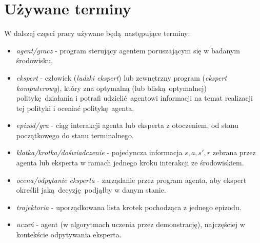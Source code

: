 \section{Używane terminy}

W dalszej częsci pracy używane będą następujące terminy:

\begin{itemize}
\item \textit{agent/gracz} - program sterujący agentem poruszającym się w badanym środowisku,
\item \textit{ekspert} - człowiek (\textit{ludzki ekspert}) lub zewnętrzny program (\textit{ekspert komputerowy}), który zna optymalną (lub bliską optymalnej) politykę działania i potrafi udzielić agentowi informacji na temat realizacji tej polityki i oceniać politykę agenta,
\item \textit{epizod/gra} - ciąg interakcji agenta lub eksperta z otoczeniem, od stanu początkowego do stanu terminalnego.
\item \textit{klatka/krotka/doświadczenie} - pojedyncza informacja $s,a,s',r$ zebrana przez agenta lub eksperta w ramach jednego kroku interakcji ze środowiskiem.  
\item \textit{ocena/odpytanie eksperta} - zarządanie przez program agenta, aby ekspert określił jaką decyzję podjąłby w danym stanie.
\item \textit{trajektoria} - uporządkowana lista krotek pochodząca z jednego epizodu.
\item \textit{uczeń} - agent (w algorytmach uczenia przez demonstrację), najczęściej w kontekście odpytywania eksperta.
\end{itemize}
